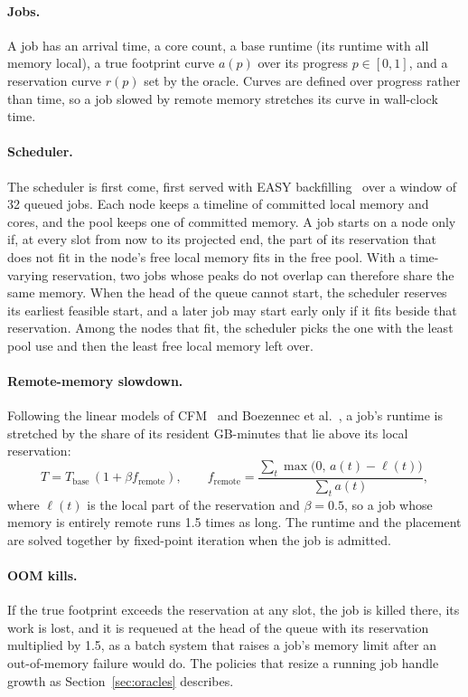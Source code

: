 \documentclass[11pt]{article}
\newcommand{\secref}[1]{Section~\ref{#1}}
\begin{document}
\paragraph{Jobs.} A job has an arrival time, a core count, a base runtime (its runtime with all memory local), a true
footprint curve $a(p)$ over its progress $p \in [0, 1]$, and a reservation curve $r(p)$ set by the oracle. Curves are
defined over progress rather than time, so a job slowed by remote memory stretches its curve in wall-clock time.

\paragraph{Scheduler.} The scheduler is first come, first served with EASY backfilling~\cite{Lifka1995EASY} over a window
of 32 queued jobs. Each node keeps a timeline of committed local memory and cores, and the pool keeps one of committed
memory. A job starts on a node only if, at every slot from now to its projected end, the part of its reservation that
does not fit in the node's free local memory fits in the free pool. With a time-varying reservation, two jobs whose
peaks do not overlap can therefore share the same memory. When the head of the queue cannot start, the scheduler reserves
its earliest feasible start, and a later job may start early only if it fits beside that reservation. Among the nodes
that fit, the scheduler picks the one with the least pool use and then the least free local memory left over.

\paragraph{Remote-memory slowdown.} Following the linear models of CFM~\cite{Amaro2020CFM} and Boezennec et
al.~\cite{Boezennec2024}, a job's runtime is stretched by the share of its resident GB-minutes that lie above its local
reservation:
\begin{equation}
T = T_{\mathrm{base}}\,(1 + \beta f_{\mathrm{remote}}), \qquad
f_{\mathrm{remote}} = \frac{\sum_t \max\bigl(0,\, a(t) - \ell(t)\bigr)}{\sum_t a(t)},
\end{equation}
where $\ell(t)$ is the local part of the reservation and $\beta = 0.5$, so a job whose memory is entirely remote runs 1.5
times as long. The runtime and the placement are solved together by fixed-point iteration when the job is admitted.

\paragraph{OOM kills.} If the true footprint exceeds the reservation at any slot, the job is killed there, its work is
lost, and it is requeued at the head of the queue with its reservation multiplied by 1.5, as a batch system that raises a
job's memory limit after an out-of-memory failure would do. The policies that resize a running job handle growth as
\secref{sec:oracles} describes.
\end{document}
